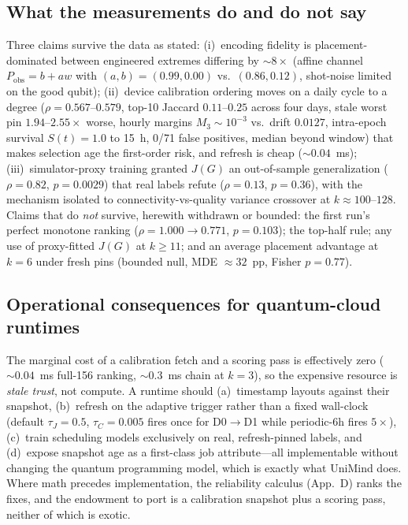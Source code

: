 \documentclass[journal,10pt,twocolumn]{IEEEtran}
\begin{document}
\subsection{What the measurements do and do not say}
Three claims survive the data as stated: (i)~encoding fidelity is placement-dominated between engineered extremes
differing by $\sim8\times$ (affine channel $P_{\mathrm{obs}}=b+a w$ with $(a,b)=(0.99,0.00)$ vs.\ $(0.86,0.12)$,
shot-noise limited on the good qubit); (ii)~device calibration ordering moves on a daily cycle to a degree
($\rho{=}0.567$--$0.579$, top-10 Jaccard $0.11$--$0.25$ across four days, stale worst pin $1.94$--$2.55\times$ worse, hourly margins
$M_3\sim10^{-3}$ vs.\ drift $0.0127$, intra-epoch survival $S(t){=}1.0$ to 15~h, 0/71 false positives, median beyond window)
that makes selection age the first-order risk, and refresh is cheap
($\sim0.04$~ms); (iii)~simulator-proxy training granted $J(G)$ an out-of-sample generalization
($\rho{=}0.82$, $p{=}0.0029$) that real labels refute ($\rho{=}0.13$, $p{=}0.36$), with the mechanism isolated
to connectivity-vs-quality variance crossover at $k\approx100$--$128$. Claims that do \emph{not} survive,
herewith withdrawn or bounded: the first run's perfect monotone ranking ($\rho{=}1.000\to0.771$, $p{=}0.103$);
the top-half rule; any use of proxy-fitted $J(G)$ at $k\ge11$; and an average placement advantage at $k{=}6$
under fresh pins (bounded null, MDE $\approx32$~pp, Fisher $p{=}0.77$).

\subsection{Operational consequences for quantum-cloud runtimes}
The marginal cost of a calibration fetch and a scoring pass is effectively zero ($\sim0.04$~ms full-156 ranking,
$\sim0.3$~ms chain at $k{=}3$), so the expensive resource is \emph{stale trust}, not compute. A runtime should
(a)~timestamp layouts against their snapshot, (b)~refresh on the adaptive trigger rather than a fixed wall-clock
(default $\tau_J{=}0.5$, $\tau_C{=}0.005$ fires once for D0$\to$D1 while periodic-$6$h fires $5\times$),
(c)~train scheduling models exclusively on real, refresh-pinned labels, and (d)~expose snapshot age as a
first-class job attribute---all implementable without changing the quantum programming model, which is exactly
what UniMind does. Where math precedes implementation, the reliability calculus (App.~D) ranks the
fixes, and the endowment to port is a calibration snapshot plus a scoring pass, neither of which is exotic.
\end{document}
